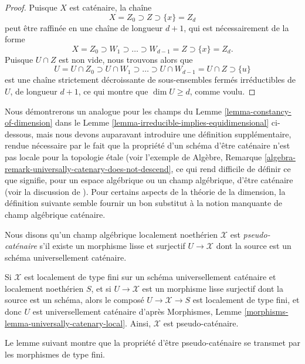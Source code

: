 \begin{proof}
\medskip\noindent
Puisque $X$ est caténaire, la chaîne
$$
X = Z_0 \supset Z \supset \{x\} = Z_d
$$
peut être raffinée en une chaîne de longueur $d+1$, qui est nécessairement
de la forme
$$
X = Z_0 \supset W_1 \supset \ldots \supset W_{d-1} = Z \supset \{x\} = Z_d.
$$
Puisque $U\cap Z$ est non vide, nous trouvons alors que
$$
U = U \cap Z_0 \supset U \cap W_1\supset \ldots \supset U\cap W_{d-1}
= U\cap Z \supset \{u\}
$$
est une chaîne strictement décroissante de sous-ensembles fermés irréductibles
de $U$, de longueur $d+1$, ce qui montre que $\dim U \geq d$,
comme voulu.
\end{proof}

\noindent
Nous démontrerons un analogue pour les champs
du Lemme \ref{lemma-constancy-of-dimension}
dans le Lemme \ref{lemma-irreducible-implies-equidimensional} ci-dessous,
mais nous devons auparavant introduire une définition supplémentaire,
rendue nécessaire par le fait que la propriété d'un schéma d'être caténaire
n'est pas locale pour la topologie étale
(voir l'exemple de
Algèbre, Remarque \ref{algebra-remark-universally-catenary-does-not-descend},
ce qui rend difficile de définir ce que signifie, pour un espace algébrique
ou un champ algébrique, d'être caténaire
(voir la discussion de \cite[page 3]{Osserman}).
Pour certains aspects de la théorie de la dimension, la définition
suivante semble fournir un bon substitut à la notion manquante
de champ algébrique caténaire.

\begin{definition}
\label{definition-pseudo-catenary}
Nous disons qu'un champ algébrique localement noethérien $\mathcal{X}$
est {\it pseudo-caténaire} s'il existe un morphisme lisse
et surjectif $U \to \mathcal{X}$ dont la source est
un schéma universellement caténaire.
\end{definition}

\begin{example}
\label{example-pseudo-catenary}
Si $\mathcal{X}$ est localement de type fini sur un schéma universellement
caténaire et localement noethérien $S$,
et si $U\to \mathcal{X}$ est un morphisme lisse surjectif
dont la source est un schéma, alors le composé
$U \to \mathcal{X} \to S$ est localement de type fini,
et donc $U$ est universellement caténaire d'après
Morphismes, Lemme
\ref{morphisms-lemma-universally-catenary-local}.
Ainsi, $\mathcal{X}$ est pseudo-caténaire.
\end{example}

\noindent
Le lemme suivant montre que la propriété d'être pseudo-caténaire
se transmet par les morphismes de type fini.

